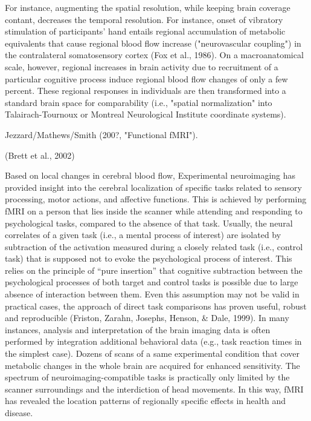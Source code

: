 \documentclass[authoryear,review,3p]{elsarticle}
\begin{document}
For instance, augmenting the spatial resolution, while keeping
brain coverage contant, decreases the temporal resolution.
%
For instance, onset of vibratory stimulation of participants' hand
entails regional accumulation of metabolic equivalents that cause
regional blood flow increase ("neurovascular coupling") in the
contralateral somatosensory cortex (Fox et al., 1986).
On a macroanatomical scale, however, regional increases
in brain activity due to recruitment of a particular cognitive
process induce regional blood flow changes of only a few percent.
%
These regional responses in individuals are then transformed
into a standard brain space for comparability
(i.e., "spatial normalization" into 
Talairach-Tournoux or Montreal Neurological Institute
coordinate systems).






Jezzard/Mathews/Smith (200?, "Functional fMRI").


(Brett et al., 2002)




Based on local changes in cerebral blood flow,
Experimental neuroimaging has provided insight into the cerebral localization
of specific tasks related to sensory processing, motor actions,
and affective functions.
This is achieved by
performing fMRI on a person that lies
inside the scanner while attending and responding to psychological tasks,
compared to the absence of that task.
Usually, the neural correlates of a given task
(i.e., a mental process of interest) are isolated by subtraction
of the activation measured during a closely related task (i.e., control task)
that is supposed not to evoke the psychological process of interest.
This relies on the principle of “pure insertion” that
cognitive subtraction between the psychological processes of both
target and control tasks is possible due to large absence of
interaction between them.
Even this assumption may not be valid in
practical cases,
the approach of direct task comparisons has proven
useful, robust and reproducible
(Friston, Zarahn, Josephs, Henson, & Dale, 1999).
%
In many instances,
analysis and interpretation of the brain imaging data
is often performed by integration additional
behavioral data (e.g., task reaction times in the simplest case).
Dozens of scans of a same experimental condition
that cover metabolic changes in the whole brain are acquired
for enhanced sensitivity.
%
The spectrum of neuroimaging-compatible tasks is practically
only limited by the scanner surroundings
and the interdiction of head movements.
%
In this way, fMRI has revealed the location patterns of
regionally specific effects in health and disease.
\end{document}
